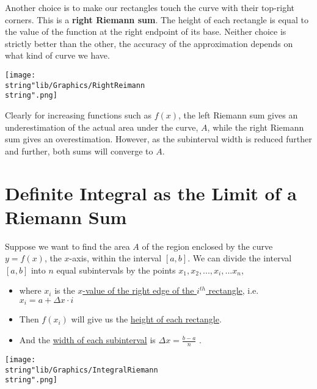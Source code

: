 \documentclass[11pt,a4paper]{book}
\begin{document}
Another choice is to make our rectangles touch the curve with their
top-right corners. This is a \textbf{right Riemann sum}. The height
of each rectangle is equal to the value of the function at the right
endpoint of its base. Neither choice is strictly better than the other,
the accuracy of the approximation depends on what kind of curve we
have.
\begin{center}
\texttt{[image: \\string"lib/Graphics/RightReimann\\string".png]}
\par\end{center}

Clearly for increasing functions such as $f\left(x\right)$, the left
Riemann sum gives an underestimation of the actual area under the curve,
$A$, while the right Riemann sum gives an overestimation. However,
as the subinterval width is reduced further and further, both sums
will converge to $A$.

\newpage{}

\section{Definite Integral as the Limit of a Riemann Sum}

Suppose we want to find the area $A$ of the region enclosed by the
curve $y=f(x)$, the $x$-axis, within the interval $[a,b]$. We can
divide the interval $[a,b]$ into $n$ equal subintervals by the points
$x_{1},x_{2},...,x_{i},...x_{n}$,

\begin{minipage}[t]{.5\textwidth}

\medskip
\begin{itemize}
\item where $x_{i}$ is the \uline{\mbox{$x$}-value of the right edge
of the \mbox{$i^{th}$} rectangle}, i.e. $x_{i}=a+\Delta x\cdot i$
\item Then $f(x_{i})$ will give us the \uline{height of each rectangle}.
\item And the \uline{width of each subinterval} is $\Delta x={\displaystyle \frac{b-a}{n}}$
.
\end{itemize}
\end{minipage}
\begin{minipage}[t]{.5\textwidth}
\begin{center}
\texttt{[image: \\string"lib/Graphics/IntegralRiemann\\string".png]}
\par\end{center}

\end{minipage}
\end{document}

